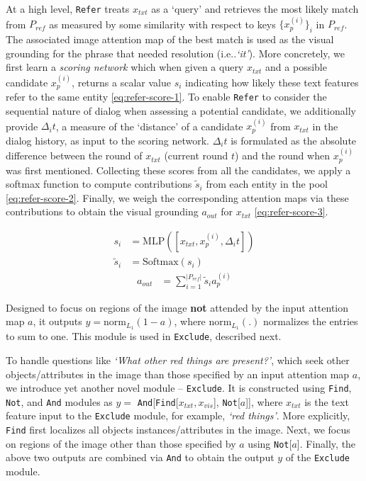 \documentclass[runningheads]{llncs}
\makeatletter
\DeclareRobustCommand\onedot{\futurelet\@let@token\@onedot}
\def\@onedot{\ifx\@let@token.\else.\null\fi\xspace}
\def\ie{i.e\onedot} \def\Ie{I.e\onedot}
\newcommand{\myparagraph}[1]{\vspace{0pt}\noindent{\bf #1}}
\makeatother
\begin{document}
At a high level, \texttt{Refer} treats $x_{txt}$ as a `query' and retrieves
the most likely match from $P_{ref}$ as measured by some similarity with
respect to keys $\{x_p^{(i)}\}_i$ in $P_{ref}$.
The associated image attention map of the best match is used as the visual 
grounding for the phrase that needed resolution (\ie \textit{`it'}).
More concretely, we first learn a \textit{scoring network} which when given a 
query $x_{txt}$ and a possible candidate $x_p^{(i)}$, returns a scalar value 
$s_i$ indicating how likely these text features refer to the same entity
\eqref{eq:refer-score-1}.
To enable \texttt{Refer} to consider the sequential nature of dialog when 
assessing a potential candidate, we additionally provide $\Delta_i t$, a measure of the `distance' of a candidate $x_p^{(i)}$ from $x_{txt}$ 
in the dialog history, as input to the scoring network.
$\Delta_i t$ is formulated as the absolute difference between the round of
$x_{txt}$ (current round $t$) and the round when $x_p^{(i)}$ was first
mentioned.
Collecting these scores from all the candidates, we apply a softmax function
to compute contributions $\tilde{s}_i$ from each entity in the pool 
\eqref{eq:refer-score-2}.
Finally, we weigh the corresponding attention maps via these contributions
to obtain the visual grounding $a_{out}$ for $x_{txt}$
\eqref{eq:refer-score-3}.
\begin{multicols}{2}
\vspace*{-30pt}
\begin{align}
s_i &= \text{MLP}([x_{txt}, x_p^{(i)}, \Delta_i t]) \label{eq:refer-score-1}\\
\tilde{s}_i &= \text{Softmax}(s_i) \label{eq:refer-score-2}
\end{align}
\columnbreak
\begin{align}
a_{out} &= \sum_{i=1}^{|P_{ref}|} \tilde{s}_i a_p^{(i)} \label{eq:refer-score-3}
\end{align}
\end{multicols}
\vspace*{-20pt}

\myparagraph{\texttt{Not} Module.}
Designed to focus on regions of the image \textbf{not} attended by the input 
attention map $a$, it outputs $y = \text{norm}_{L_1}(1-a)$, where 
norm$_{L_1}(.)$ normalizes the entries to sum to one.
This module is used in \texttt{Exclude}, described next.

\myparagraph{\texttt{Exclude} Module.}
To handle questions like \textit{`What other red things are present?'}, which 
seek other objects/attributes in the image than those specified by an input
attention map $a$, we introduce yet another novel module -- \texttt{Exclude}.
It is constructed using \texttt{Find}, \texttt{Not}, and \texttt{And} modules
as $y =$ \texttt{And}[\texttt{Find}[$x_{txt}, x_{vis}$], \texttt{Not}[$a$]],
where $x_{txt}$ is the text feature input to the \texttt{Exclude} module, for 
example, \textit{`red things'}.
More explicitly, \texttt{Find} first localizes all objects instances/attributes 
in the image.
Next, we focus on regions of the image other than those specified by $a$ using 
\texttt{Not}[$a$].
Finally, the above two outputs are combined via \texttt{And} to obtain the 
output $y$ of the \texttt{Exclude} module.
\end{document}
